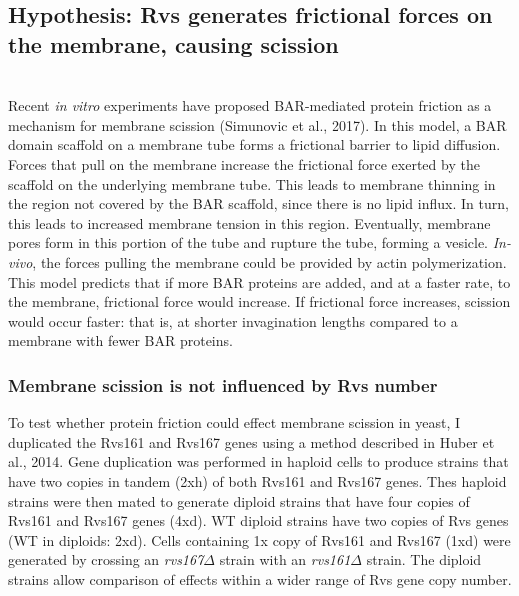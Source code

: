 	\vspace{5mm}




\newpage

\subsection{Hypothesis: Rvs generates frictional forces on the membrane, causing scission}
				\mbox{}\\
Recent \textit{in vitro} experiments have proposed BAR-mediated protein friction as a mechanism for membrane scission (Simunovic et al., 2017). In this model, a BAR domain scaffold on a membrane tube forms a frictional barrier to lipid diffusion. Forces that pull on the membrane increase the frictional force exerted by the scaffold on the underlying membrane tube. This leads to membrane thinning in the region not covered by the BAR scaffold, since there is no lipid influx. In turn, this leads to increased membrane tension in this region. Eventually, membrane pores form in this portion of the tube and rupture the tube, forming a vesicle. \textit{In-vivo}, the forces pulling the membrane could be provided by actin polymerization.
This model predicts that if more BAR proteins are added, and at a faster rate, to the membrane, frictional force would increase. If frictional force increases, scission would occur faster: that is, at shorter invagination lengths compared to a membrane with fewer BAR proteins. 


	\subsubsection{Membrane scission is not influenced by Rvs number}
To test whether protein friction could effect membrane scission in yeast, I duplicated the Rvs161 and Rvs167 genes using a method described in Huber et al., 2014. Gene duplication was performed in haploid cells to produce strains that have two copies in tandem (2xh) of both Rvs161 and Rvs167 genes. Thes haploid strains were then mated to generate diploid strains that have four copies of Rvs161 and Rvs167 genes (4xd). WT diploid strains have two copies of Rvs genes (WT in diploids: 2xd). Cells containing 1x copy of Rvs161 and Rvs167 (1xd) were generated by crossing an \textit{rvs167$\Delta$}
 strain with an \textit{rvs161$\Delta$} strain. The diploid strains allow comparison of effects within a wider range of Rvs gene copy number. 




